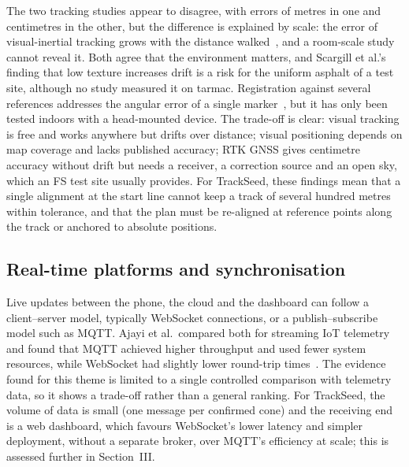 The two tracking studies appear to disagree, with errors of metres in one and centimetres in the other, but the difference is explained by scale: the error of visual-inertial tracking grows with the distance walked~\cite{feigl2020}, and a room-scale study cannot reveal it. Both agree that the environment matters, and Scargill et al.'s finding that low texture increases drift is a risk for the uniform asphalt of a test site, although no study measured it on tarmac. Registration against several references addresses the angular error of a single marker~\cite{nunes2023}, but it has only been tested indoors with a head-mounted device. The trade-off is clear: visual tracking is free and works anywhere but drifts over distance; visual positioning depends on map coverage and lacks published accuracy; RTK GNSS gives centimetre accuracy without drift but needs a receiver, a correction source and an open sky, which an FS test site usually provides. For TrackSeed, these findings mean that a single alignment at the start line cannot keep a track of several hundred metres within tolerance, and that the plan must be re-aligned at reference points along the track or anchored to absolute positions.

\subsection{Real-time platforms and synchronisation}
Live updates between the phone, the cloud and the dashboard can follow a client--server model, typically WebSocket connections, or a publish--subscribe model such as MQTT. Ajayi et al.\ compared both for streaming IoT telemetry and found that MQTT achieved higher throughput and used fewer system resources, while WebSocket had slightly lower round-trip times~\cite{ajayi2023}. The evidence found for this theme is limited to a single controlled comparison with telemetry data, so it shows a trade-off rather than a general ranking. For TrackSeed, the volume of data is small (one message per confirmed cone) and the receiving end is a web dashboard, which favours WebSocket's lower latency and simpler deployment, without a separate broker, over MQTT's efficiency at scale; this is assessed further in Section~III.

